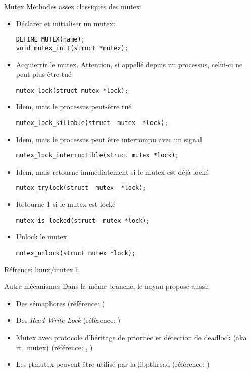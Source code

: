 \begin{frame}[fragile=singleslide]{Mutex}
  Méthodes assez classiques des mutex:
  \begin{itemize}
  \item Déclarer et initialiser un mutex:
    \begin{lstlisting} 
DEFINE_MUTEX(name);
void mutex_init(struct *mutex);
    \end{lstlisting} 
  \item  Acquierrir   le  mutex.  Attention,  si   appellé  depuis  un
    processus,     celui-ci     ne      peut     plus     être     tué
    \begin{lstlisting} 
mutex_lock(struct mutex *lock);
    \end{lstlisting} 
  \item Idem, mais le processus peut-être tué
    \begin{lstlisting} 
mutex_lock_killable(struct  mutex  *lock);
    \end{lstlisting} 
  \item Idem, mais le processus peut être interrompu avec un signal
    \begin{lstlisting} 
mutex_lock_interruptible(struct mutex *lock);
    \end{lstlisting} 
  \item Idem, mais retourne immédiatement si le mutex est déjà locké
    \begin{lstlisting} 
mutex_trylock(struct  mutex  *lock); 
    \end{lstlisting} 
  \item Retourne 1 si le mutex est locké
    \begin{lstlisting} 
mutex_is_locked(struct  mutex *lock);
    \end{lstlisting} 
  \item  Unlock le mutex
    \begin{lstlisting} 
mutex_unlock(struct mutex *lock);
    \end{lstlisting} 
  \end{itemize}
  Réfrence: \c{linux/mutex.h}
\end{frame} 

\begin{frame}[fragile=singleslide]{Autre mécanismes}
Dans la même branche, le noyau propose aussi:
\begin{itemize} 
\item Des sémaphores (référence: )
\item Des \emph{Read-Write Lock} (référence: )
\item  Mutex avec protocole  d'héritage de  prioritée et  détection de
  deadlock           (aka           \c{rt_mutex})          (référence:
  , )
\item  Les   \c{rtmutex}  peuvent  être  utilisé   par  la  \c{libpthread}
  (référence:                         
  )
\end{itemize} 
\end{frame} 

